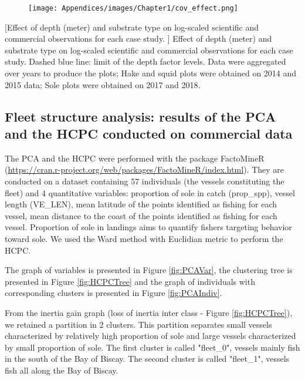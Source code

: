 \begin{figure}[H]
   \begin{center}
      \texttt{[image: Appendices/images/Chapter1/cov\_effect.png]}
   \end{center}
   \label{fig:EffCov}
\end{figure}

[Effect of depth (meter) and substrate type on log-scaled scientific and commercial observations for each case study. ]
   {Effect of depth (meter) and substrate type on log-scaled scientific and commercial observations for each case study. Dashed blue line: limit of the depth factor levels. Data were aggregated over years to produce the plots; Hake and squid plots were obtained on 2014 and 2015 data; Sole plots were obtained on 2017 and 2018.}

\clearpage

\subsection{Fleet structure analysis: results of the PCA and the HCPC conducted on commercial data}\label{appendix:FlStruct}

The PCA and the HCPC were performed with the package FactoMineR (\url{https://cran.r-project.org/web/packages/FactoMineR/index.html}). They are conducted on a dataset containing 57 individuals (the vessels constituting the fleet) and 4 quantitative variables: proportion of sole in catch (prop_spp), vessel length (VE_LEN), mean latitude of the points identified as fishing for each vessel, mean distance to the coast of the points identified as fishing for each vessel. Proportion of sole in landings aims to quantify fishers targeting behavior toward sole. We used the Ward method with Euclidian metric to perform the HCPC.

The graph of variables is presented in Figure \ref{fig:PCAVar}, the clustering tree is presented in Figure \ref{fig:HCPCTree} and the graph of individuals with corresponding clusters is presented in Figure \ref{fig:PCAIndiv}.

From the inertia gain graph (loss of inertia inter class - Figure \ref{fig:HCPCTree}), we retained a partition in 2 clusters. This partition separates small vessels characterized by relatively high proportion of sole and large vessels characterized by small proportion of sole. The first cluster is called "fleet_0", vessels mainly fish in the south of the Bay of Biscay. The second cluster is called "fleet_1", vessels fish all along the Bay of Biscay.

